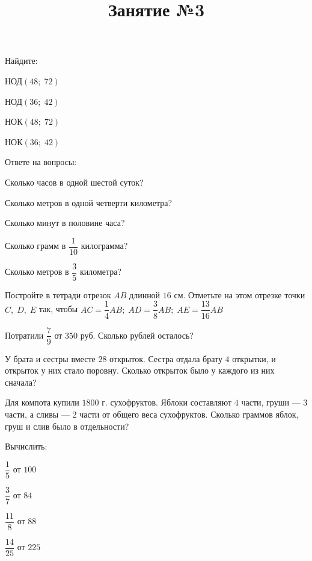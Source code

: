 \begin{listofex}
	\item Найдите:
	\begin{enumcols}[itemcolumns=4]
		\item НОД\( (48;\;72) \)
		\item НОД\( (36;\;42) \)
		\item НОК\( (48;\;72) \)
		\item НОК\( (36;\;42) \)
	\end{enumcols}
	\item Ответе на вопросы:
	\begin{enumcols}[itemcolumns=1]
		\item Сколько часов в одной шестой суток?
		\item Сколько метров в одной четверти километра?
		\item Сколько минут в половине часа?
		\item Сколько грамм в \( \dfrac{1}{10} \) килограмма?
		\item Сколько метров в \( \dfrac{3}{5} \) километра?
	\end{enumcols}
	\item Постройте в тетради отрезок \( AB \) длинной \( 16 \) см. Отметьте на этом отрезке точки \( C,\;D,\;E \) так, чтобы \( AC=\dfrac{1}{4}AB;\;AD=\dfrac{3}{8}AB;\;AE=\dfrac{13}{16}AB \)
	\item Потратили \( \dfrac{7}{9} \) от \( 350 \) руб. Сколько рублей осталось?
	\item У брата и сестры вместе \( 28 \) открыток. Сестра отдала брату \( 4 \) открытки, и открыток у них стало поровну. Сколько открыток было у каждого из них сначала?
	\item Для компота купили \( 1800 \) г. сухофруктов. Яблоки составляют \( 4 \) части, груши --- 3 части, а сливы --- 2 части от общего веса сухофруктов. Сколько граммов яблок, груш и слив было в отдельности?
	\item Вычислить:
	\begin{enumcols}[itemcolumns=4]
		\item \( \dfrac{1}{5} \) от \( 100 \)
		\item \( \dfrac{3}{7} \) от \( 84 \)
		\item \( \dfrac{11}{8} \) от \( 88 \)
		\item \( \dfrac{14}{25} \) от \( 225 \)
	\end{enumcols}
\end{listofex}
\newpage
\title{Занятие №3}
